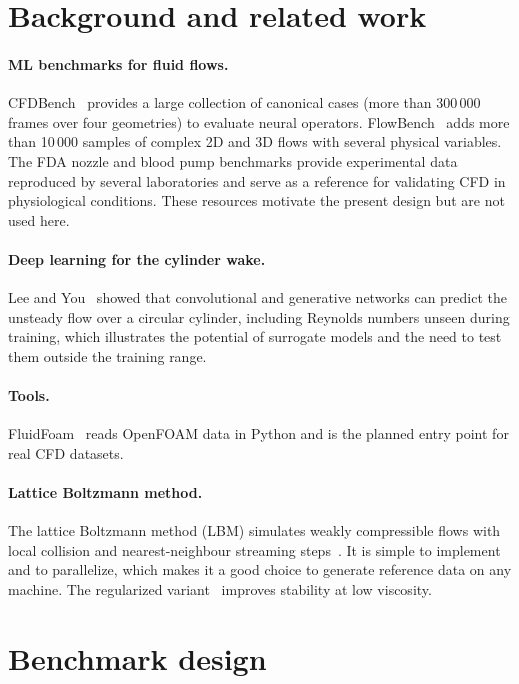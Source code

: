 \documentclass[11pt,a4paper]{article}
\begin{document}
\section{Background and related work}
\paragraph{ML benchmarks for fluid flows.} CFDBench~\cite{luo2023cfdbench} provides a large collection of canonical cases (more than 300\,000 frames over four geometries) to evaluate neural operators. FlowBench~\cite{tali2024flowbench} adds more than 10\,000 samples of complex 2D and 3D flows with several physical variables. The FDA nozzle and blood pump benchmarks provide experimental data reproduced by several laboratories and serve as a reference for validating CFD in physiological conditions. These resources motivate the present design but are not used here.

\paragraph{Deep learning for the cylinder wake.} Lee and You~\cite{lee2019data} showed that convolutional and generative networks can predict the unsteady flow over a circular cylinder, including Reynolds numbers unseen during training, which illustrates the potential of surrogate models and the need to test them outside the training range.

\paragraph{Tools.} FluidFoam~\cite{fluidfoam} reads OpenFOAM data in Python and is the planned entry point for real CFD datasets.

\paragraph{Lattice Boltzmann method.} The lattice Boltzmann method (LBM) simulates weakly compressible flows with local collision and nearest-neighbour streaming steps~\cite{kruger2017lbm}. It is simple to implement and to parallelize, which makes it a good choice to generate reference data on any machine. The regularized variant~\cite{latt2006regularized} improves stability at low viscosity.

\section{Benchmark design}
\end{document}
